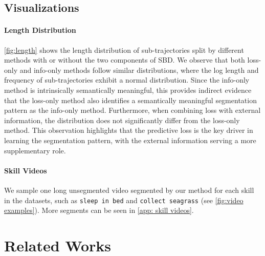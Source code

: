 
\subsection{Visualizations}
\label{subsec:visual}
\paragraph{Length Distribution}
\cref{fig:length} shows the length distribution of sub-trajectories split by different methods with or without the two components of SBD. We observe that both loss-only and info-only methods follow similar distributions, where the log length and frequency of sub-trajectories exhibit a normal distribution. Since the info-only method is intrinsically semantically meaningful, this provides indirect evidence that the loss-only method also identifies a semantically meaningful segmentation pattern as the info-only method. Furthermore, when combining loss with external information, the distribution does not significantly differ from the loss-only method. This observation highlights that the predictive loss is the key driver in learning the segmentation pattern, with the external information serving a more supplementary role.

\paragraph{Skill Videos}
We sample one long unsegmented video segmented by our method for each skill in the datasets, such as \texttt{sleep in bed} and \texttt{collect seagrass} (see \cref{fig:video examples}). More segments can be seen in \cref{app: skill videos}.

\section{Related Works}
\label{sec:related}
